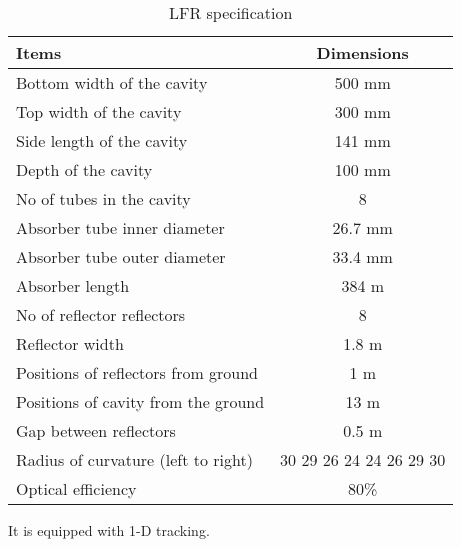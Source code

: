 \begin{table}[H]
\centering
\caption{LFR specification}
\label{lfrspectab}
\begin{tabular}{@{}|l|c|@{}}
\toprule
\textbf{Items}                      & \textbf{Dimensions} \\ \midrule
Bottom width of the cavity          & 500 mm              \\ \midrule
Top width of the cavity             & 300 mm              \\ \midrule
Side length of the cavity           & 141 mm              \\ \midrule
Depth of the cavity                 & 100 mm              \\ \midrule
No of tubes in the cavity           & 8                   \\ \midrule
Absorber tube inner diameter        & 26.7 mm             \\ \midrule
Absorber tube outer diameter        & 33.4 mm             \\ \midrule
Absorber length                     & 384 m               \\ \midrule
No of reflector reflectors             & 8                   \\ \midrule
Reflector width                     & 1.8 m               \\ \midrule
Positions of reflectors from ground & 1 m                 \\ \midrule
Positions of cavity from the ground & 13 m                \\ \midrule
Gap between reflectors                  & 0.5 m                   \\ \midrule
Radius of  curvature (left to right) & 30 29 26 24 24 26 29 30 \\ \midrule
Optical efficiency                   & 80\%                    \\ \bottomrule
\end{tabular}
\end{table}
It is equipped with 1-D tracking.
